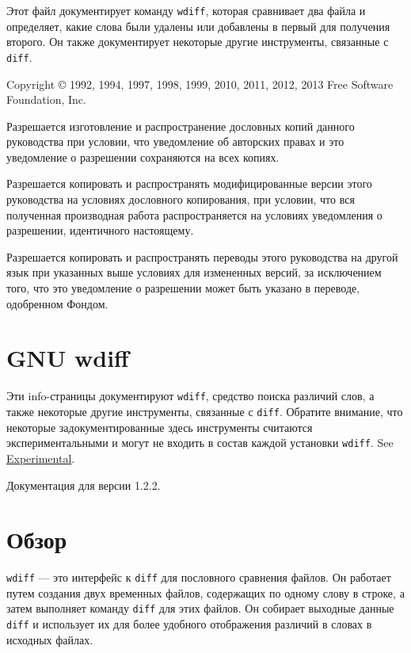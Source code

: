 Этот файл документирует команду \texttt{wdiff}, которая сравнивает два
файла и определяет, какие слова были удалены или добавлены в первый для
получения второго. Он также документирует некоторые другие инструменты,
связанные с \texttt{diff}.

Copyright © 1992, 1994, 1997, 1998, 1999, 2010, 2011, 2012, 2013 Free
Software Foundation, Inc.

Разрешается изготовление и распространение дословных копий данного
руководства при условии, что уведомление об авторских правах и это
уведомление о разрешении сохраняются на всех копиях.

Разрешается копировать и распространять модифицированные версии этого
руководства на условиях дословного копирования, при условии, что вся
полученная производная работа распространяется на условиях уведомления о
разрешении, идентичного настоящему.

Разрешается копировать и распространять переводы этого руководства на
другой язык при указанных выше условиях для измененных версий, за
исключением того, что это уведомление о разрешении может быть указано в
переводе, одобренном Фондом.

\hypertarget{Top}{%
\section{GNU wdiff}\label{Top}}

Эти info-страницы документируют \texttt{wdiff}, средство поиска различий
слов, а также некоторые другие инструменты, связанные с \texttt{diff}.
Обратите внимание, что некоторые задокументированные здесь инструменты
считаются экспериментальными и могут не входить в состав каждой
установки \texttt{wdiff}. See
\protect\hyperlink{Experimental}{Experimental}.

Документация для версии 1.2.2.

\hypertarget{_041e_0431_0437_043e_0440}{%
\section{Обзор}\label{_041e_0431_0437_043e_0440}}

\texttt{wdiff} --- это интерфейс к \texttt{diff} для пословного
сравнения файлов. Он работает путем создания двух временных файлов,
содержащих по одному слову в строке, а затем выполняет команду
\texttt{diff} для этих файлов. Он собирает выходные данные \texttt{diff}
и использует их для более удобного отображения различий в словах в
исходных файлах.

